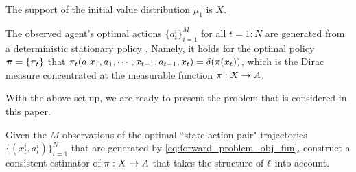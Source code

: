 \begin{assumption}\label{ass:init_value}
The support of the initial value distribution $\mu_1$ is $X$.
\end{assumption}

\begin{assumption}\label{ass:stationary_markov_policy}
The observed agent's optimal actions $\{a_t^i\}_{i=1}^M$ for all $t=1:N$ are generated from a deterministic stationary policy \citep[Def.~2.3.2]{hernandez2012discrete}. Namely, it holds for the optimal policy $\bm{\relax{\pi}}=\{\relax{\pi}_t\}$ that $\relax{\pi}_t(a|x_1,a_1,\cdots,x_{t-1},a_{t-1},x_t) = \delta(\relax{\pi}(x_t))$, which is the Dirac measure concentrated at the measurable function $\relax{\pi}:X\rightarrow A$.
\end{assumption}

With the above set-up, we are ready to present the problem that is considered in this paper. 

\begin{problem}\label{pro:ioc}
  Given the $M$ observations of the optimal ``state-action pair" trajectories $\{(x_t^i,a_t^i)\}_{t=1}^N$ that are generated by \eqref{eq:forward_problem_obj_fun}, construct a consistent estimator of $\relax{\pi}:X\rightarrow A$ that takes the structure of $\relax{\ell}$ into account.
\end{problem}



